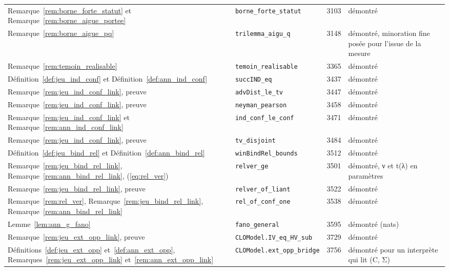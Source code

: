 {\begin{longtable}{@{}p{4.6cm}p{5.2cm}p{0.9cm}>{\raggedright\arraybackslash}p{3.6cm}@{}}
Remarque~\ref{rem:borne_forte_statut} et Remarque~\ref{rem:borne_aigue_portee} & \texttt{borne\_\allowbreak{}forte\_\allowbreak{}statut} & 3103 & démontré \\
Remarque~\ref{rem:borne_aigue_pq} & \texttt{trilemma\_\allowbreak{}aigu\_\allowbreak{}q} & 3148 & démontré, minoration fine posée pour l'issue de la mesure \\
Remarque~\ref{rem:temoin_realisable} & \texttt{temoin\_\allowbreak{}realisable} & 3365 & démontré \\
Définition~\ref{def:jeu_ind_conf} et Définition~\ref{def:ann_ind_conf} & \texttt{succIND\_\allowbreak{}eq} & 3437 & démontré \\
Remarque~\ref{rem:jeu_ind_conf_link}, preuve & \texttt{advDist\_\allowbreak{}le\_\allowbreak{}tv} & 3447 & démontré \\
Remarque~\ref{rem:jeu_ind_conf_link}, preuve & \texttt{neyman\_\allowbreak{}pearson} & 3458 & démontré \\
Remarque~\ref{rem:jeu_ind_conf_link} et Remarque~\ref{rem:ann_ind_conf_link} & \texttt{ind\_\allowbreak{}conf\_\allowbreak{}le\_\allowbreak{}conf} & 3471 & démontré \\
Remarque~\ref{rem:jeu_ind_conf_link}, preuve & \texttt{tv\_\allowbreak{}disjoint} & 3484 & démontré \\
Définition~\ref{def:jeu_bind_rel} et Définition~\ref{def:ann_bind_rel} & \texttt{winBindRel\_\allowbreak{}bounds} & 3512 & démontré \\
Remarque~\ref{rem:jeu_bind_rel_link}, Remarque~\ref{rem:ann_bind_rel_link}, (\ref{eq:rel_ver}) & \texttt{relver\_\allowbreak{}ge} & 3501 & démontré, ν et t(λ) en paramètres \\
Remarque~\ref{rem:jeu_bind_rel_link}, preuve & \texttt{relver\_\allowbreak{}of\_\allowbreak{}liant} & 3522 & démontré \\
Remarque~\ref{rem:rel_ver}, Remarque~\ref{rem:jeu_bind_rel_link}, Remarque~\ref{rem:ann_bind_rel_link} & \texttt{rel\_\allowbreak{}of\_\allowbreak{}conf\_\allowbreak{}one} & 3538 & démontré \\
Lemme~\ref{lem:ann_g_fano} & \texttt{fano\_\allowbreak{}general} & 3595 & démontré (nats) \\
Remarque~\ref{rem:jeu_ext_opp_link}, preuve & \texttt{CLOModel.IV\_\allowbreak{}eq\_\allowbreak{}HV\_\allowbreak{}sub} & 3729 & démontré \\
Définitions~\ref{def:jeu_ext_opp} et~\ref{def:ann_ext_opp}, Remarques~\ref{rem:jeu_ext_opp_link} et~\ref{rem:ann_ext_opp_link} & \texttt{CLOModel.ext\_\allowbreak{}opp\_\allowbreak{}bridge} & 3756 & démontré pour un interprète qui lit (C, Σ) \\

\end{longtable}}
